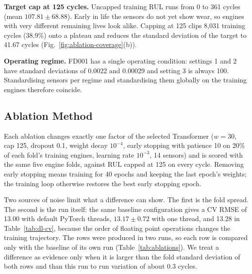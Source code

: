\textbf{Target cap at 125 cycles.}
Uncapped training RUL runs from 0 to 361 cycles (mean $107.81 \pm 68.88$).
Early in life the sensors do not yet show wear, so engines with very
different remaining lives look alike. Capping at 125 clips 8,031 training
cycles (38.9\%) onto a plateau and reduces the standard deviation of the
target to 41.67 cycles (Fig.~\ref{fig:ablation-coverage}(b)).

\textbf{Operating regime.}
FD001 has a single operating condition: settings 1 and 2 have standard
deviations of 0.0022 and 0.00029 and setting 3 is always 100. Standardising
sensors per regime and standardising them globally on the training engines
therefore coincide.

\subsection{Ablation Method}
\label{sec:ablation-methodology}

Each ablation changes exactly one factor of the selected Transformer
($w = 30$, cap 125, dropout 0.1, weight decay $10^{-4}$, early stopping with
patience 10 on 20\% of each fold's training engines, learning rate
$10^{-3}$, 14 sensors) and is scored with the same five engine folds,
against RUL capped at 125 on every cycle. Removing early stopping means
training for 40 epochs and keeping the last epoch's weights; the training
loop otherwise restores the best early stopping epoch.

Two sources of noise limit what a difference can show. The first is the
fold spread. The second is the run itself: the same baseline configuration
gives a CV RMSE of 13.00 with default PyTorch threads, $13.17 \pm 0.72$ with
one thread, and 13.28 in Table~\ref{tab:dl-cv}, because the order of
floating point operations changes the training trajectory. The rows were
produced in two runs, so each row is compared only with the baseline of its
own run (Table~\ref{tab:ablations}). We treat a difference as evidence only
when it is larger than the fold standard deviation of both rows and than
this run to run variation of about 0.3 cycles.

